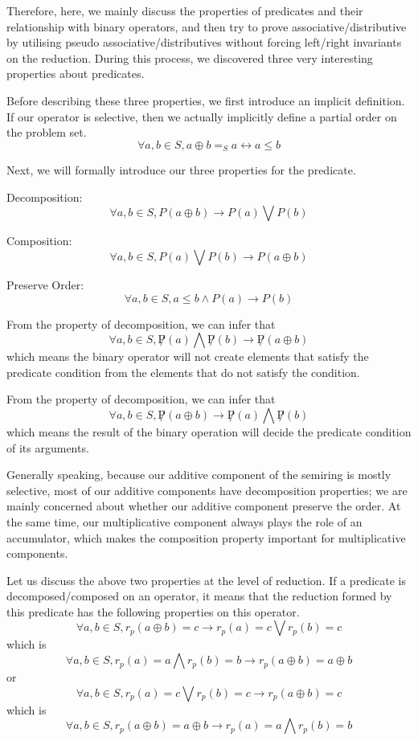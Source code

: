 \documentclass[a4paper,12pt,twoside,openright]{report}
\newcommand{\e}[2]{
\begin{equation}
  \label{#1} 
  #2
\end{equation}
}
\begin{document}
Therefore, here, we mainly discuss the properties of predicates and their relationship with binary operators, and then try to prove associative/distributive by utilising pseudo associative/distributives without forcing left/right invariants on the reduction. During this process, we discovered three very interesting properties about predicates. 

Before describing these three properties, we first introduce an implicit definition. If our operator is selective, then we actually implicitly define a partial order on the problem set.
\[\forall a,b \in S, a \oplus b =_S a \leftrightarrow a \leq b\]

Next, we will formally introduce our three properties for the predicate.

Decomposition: \e{pr:def:decomposition}{\forall a,b \in S, P(a \oplus b) \rightarrow P(a) \bigvee P (b)}
Composition: \e{pr:def:composition}{\forall a,b \in S, P(a) \bigvee P (b) \rightarrow P(a \oplus b)}
Preserve Order: \e{pr:def:preserve_order}{\forall a,b \in S, a \leq b \wedge P(a) \rightarrow P(b)}
From the property of decomposition, we can infer that \e{pr:proof:decomposition_contra}{\forall a,b \in S, \not P(a) \bigwedge \not P(b) \rightarrow \not P(a \oplus b)} which means the binary operator will not create elements that satisfy the predicate condition from the elements that do not satisfy the condition.

From the property of decomposition, we can infer that \e{pr:proof:composition_contra}{\forall a,b \in S, \not P(a \oplus b) \rightarrow \not P(a) \bigwedge \not P(b)} which means the result of the binary operation will decide the predicate condition of its arguments.

Generally speaking, because our additive component of the semiring is mostly selective, most of our additive components have decomposition properties; we are mainly concerned about whether our additive component preserve the order. At the same time, our multiplicative component always plays the role of an accumulator, which makes the composition property important for multiplicative components.

Let us discuss the above two properties at the level of reduction. If a predicate is decomposed/composed  on an operator, it means that the reduction formed by this predicate has the following properties on this operator.
\[\forall a,b \in S, r_p(a\oplus b) = c \rightarrow r_p(a) = c \bigvee r_p (b) = c\] 
which is 
\[\forall a,b \in S, r_p(a) = a \bigwedge r_p (b) = b \rightarrow r_p(a \oplus b)= a \oplus b\]
or
\[\forall a,b \in S, r_p(a) = c \bigvee r_p (b) = c \rightarrow r_p(a \oplus b)= c\]
which is 
\[\forall a,b \in S, r_p(a\oplus b) = a \oplus b \rightarrow r_p(a) = a \bigwedge r_p (b) = b\]
\end{document}
